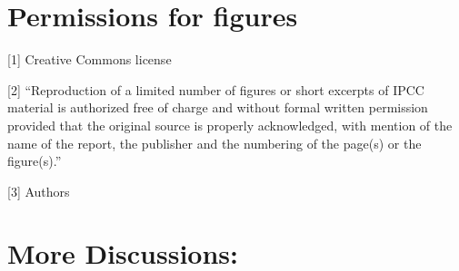 \documentclass[12pt]{article}
\begin{document}



\iflater
\newpage
\section*{Permissions for figures}

[1] Creative Commons license

[2] ``Reproduction of a limited number of figures or short excerpts of IPCC material is authorized free of charge and without formal written permission provided that the original source is properly acknowledged, with mention of the name of the report, the publisher and the numbering of the page(s) or the figure(s).''

[3] Authors


\section*{More Discussions:}
\end{document}

